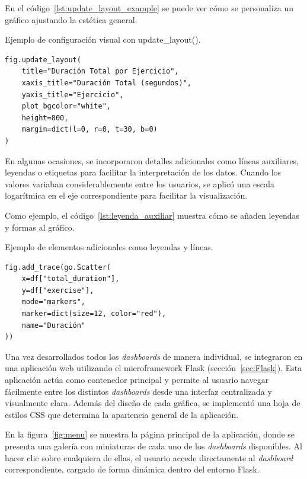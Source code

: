 \documentclass[a4paper, 12pt]{book}
\begin{document}
En el código~\ref{lst:update_layout_example} se puede ver cómo se personaliza un gráfico ajustando la estética general.

\begin{listing}[h!]
\caption{Ejemplo de configuración visual con update\_layout().}
\label{lst:update_layout_example}
\begin{verbatim}
fig.update_layout(
    title="Duración Total por Ejercicio",
    xaxis_title="Duración Total (segundos)",
    yaxis_title="Ejercicio",
    plot_bgcolor="white",
    height=800,
    margin=dict(l=0, r=0, t=30, b=0)
)
\end{verbatim}
\end{listing}

En algunas ocasiones, se incorporaron detalles adicionales como líneas auxiliares, leyendas o etiquetas para facilitar la interpretación de los datos. Cuando los valores variaban considerablemente entre los usuarios, se aplicó una escala logarítmica en el eje correspondiente para facilitar la visualización.

Como ejemplo, el código~\ref{lst:leyenda_auxiliar} muestra cómo se añaden leyendas y formas al gráfico.

\begin{listing}[h!]
\caption{Ejemplo de elementos adicionales como leyendas y líneas.}
\label{lst:leyenda_auxiliar}
\begin{verbatim}
fig.add_trace(go.Scatter(
    x=df["total_duration"],
    y=df["exercise"],
    mode="markers",
    marker=dict(size=12, color="red"),
    name="Duración"
))
\end{verbatim}
\end{listing}

Una vez desarrollados todos los \textit{dashboards} de manera individual, se integraron en una aplicación web utilizando el microframework Flask (sección~\ref{sec:Flask}). Esta aplicación actúa como contenedor principal y permite al usuario navegar fácilmente entre los distintos \textit{dashboards} desde una interfaz centralizada y visualmente clara.  
Además del diseño de cada gráfica, se implementó una hoja de estilos CSS que determina la apariencia general de la aplicación.

En la figura~\ref{fig:menu} se muestra la página principal de la aplicación, donde se presenta una galería con miniaturas de cada uno de los \textit{dashboards} disponibles. Al hacer clic sobre cualquiera de ellas, el usuario accede directamente al \textit{dashboard} correspondiente, cargado de forma dinámica dentro del entorno Flask.
\end{document}
